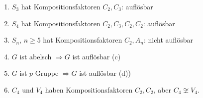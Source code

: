 \begin{example}
	\begin{enumerate}[label=(\alph*)]
		\item $S_3$ hat Kompositionsfaktoren $C_2, C_3$: auflösbar
		\item $S_4$ hat Kompositionsfaktoren $C_2,C_3,C_2,C_2$: auflösbar
		\item $S_n$, $n \geq 5$ hat Kompositionsfaktoren $C_2, A_n$: nicht auflösbar
		\item $G$ ist abelsch $\Longrightarrow G$ ist auflösbar (c)
		\item $G$ ist $p$-Gruppe $\Longrightarrow G$ ist auflösbar (d))
		\item $C_4 \text{ und } V_4$ haben Kompositionsfaktoren $C_2, C_2$, aber $C_4 \not\cong V_4$.
	\end{enumerate}
\end{example}